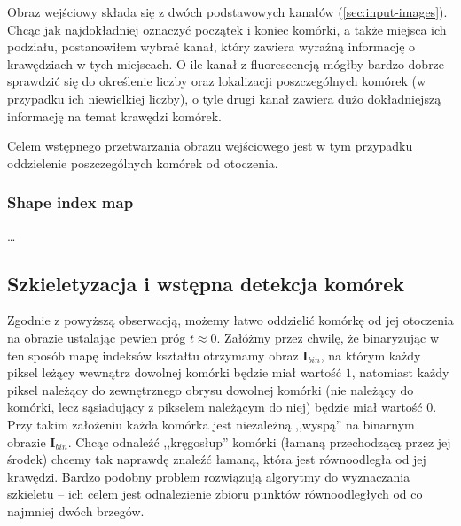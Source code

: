 \documentclass[declaration,shortabstract,mgr]{iithesis}
\newcommand{\image}{\mathbf{I}}
\begin{document}
Obraz wejściowy składa się z dwóch podstawowych kanałów (\ref{sec:input-images}).
Chcąc jak najdokładniej oznaczyć początek i koniec komórki, a także miejsca ich podziału, postanowiłem wybrać kanał, który zawiera wyraźną informację o krawędziach w tych miejscach.
O ile kanał z fluorescencją mógłby bardzo dobrze sprawdzić się do określenie liczby oraz lokalizacji poszczególnych komórek (w przypadku ich niewielkiej liczby), o tyle drugi kanał zawiera dużo dokładniejszą informację na temat krawędzi komórek.

Celem wstępnego przetwarzania obrazu wejściowego jest w tym przypadku oddzielenie poszczególnych komórek od otoczenia.

\subsubsection{Shape index map}

\ldots %

\subsection{Szkieletyzacja i wstępna detekcja komórek}

Zgodnie z powyższą obserwacją, możemy łatwo oddzielić komórkę od jej otoczenia na obrazie ustalając pewien próg $t \approx 0$. Załóżmy przez chwilę, że binaryzując w ten sposób mapę indeksów kształtu otrzymamy obraz $\image_{bin}$, na którym każdy piksel leżący wewnątrz dowolnej komórki będzie miał wartość $1$, natomiast każdy piksel należący do zewnętrznego obrysu dowolnej komórki (nie należący do komórki, lecz sąsiadujący z pikselem należącym do niej) będzie miał wartość $0$.
Przy takim założeniu każda komórka jest niezależną ,,wyspą'' na binarnym obrazie $\image_{bin}$. Chcąc odnaleźć ,,kręgosłup'' komórki (łamaną przechodzącą przez jej środek) chcemy tak naprawdę znaleźć łamaną, która jest równoodległa od jej krawędzi. Bardzo podobny problem rozwiązują algorytmy do wyznaczania szkieletu -- ich celem jest odnalezienie zbioru punktów równoodległych od co najmniej dwóch brzegów.
\end{document}
